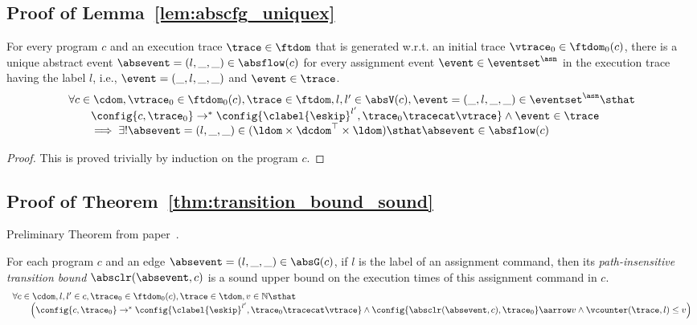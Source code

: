 \subsection{Proof of Lemma~\ref{lem:abscfg_uniquex}}
\label{apdx:abscfg_uniquex}
\begin{lemma}
  For every program $c$ and
  an execution trace $\trace \in \ftdom$ that is generated w.r.t.
  an initial trace  $\vtrace_0 \in \ftdom_0(c)$,
  there is a unique abstract event $\absevent = (l, \_, \_) \in \absflow(c)$ 
  for every assignment event $\event \in \eventset^{\asn}$ in the
  execution trace having the label $l$, i.e., $\event = (\_, l, \_, \_)$ and  $\event \in \trace$.
%
\[
  \begin{array}{l}
    \forall c \in \cdom, \vtrace_0 \in \ftdom_0(c), \trace \in \ftdom ,  l, l' \in \absV(c), \event = (\_, l, \_, \_) \in \eventset^{\asn} \sthat 
    \\ \qquad
    \config{{c}, \trace_0} \to^{*} \config{\clabel{\eskip}^{l'}, \trace_0 \tracecat \vtrace} 
  \land \event \in \trace 
    \\
    \qquad \implies \exists! \absevent = (l, \_, \_) \in (\ldom\times \dcdom^{\top} \times \ldom) \sthat  
    \absevent \in \absflow(c)
\end{array}
\]
\end{lemma}
\begin{proof}
  This is proved trivially by induction on the program $c$.
\end{proof}
%
%

\subsection{Proof of Theorem~\ref{thm:transition_bound_sound}}
  \label{apdx:weight_soundness}
  Preliminary Theorem from paper~\cite{SinnZV17}.
  \begin{theorem}
    For each program ${c}$ and an edge $\absevent = (l, \_, \_) \in \absG(c)$, if $l$ is the label of an assignment command,
    then its \emph{path-insensitive transition bound} $\absclr(\absevent, c)$ 
     is a sound upper bound on 
    the execution times of this assignment command in $c$.
      \[
        \begin{array}{l}
          \forall c \in \cdom, l, l' \in c,\trace_0 \in \ftdom_0(c), 
          \trace \in \tdom, v \in \mathbb{N}
           \sthat 
           \\ \qquad 
           \Big(\config{{c}, \trace_0} \to^{*} \config{\clabel{\eskip}^{l'}, \trace_0\tracecat\vtrace} 
           \land \config{\absclr(\absevent, c), \trace_0} \aarrow v
           \land
          \vcounter(\trace, l) \leq v
          \Big)
        \end{array}
        \]
  \end{theorem}


